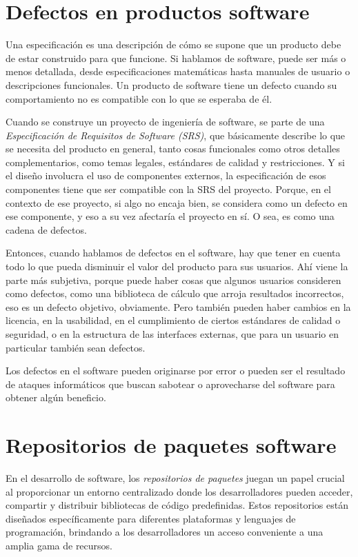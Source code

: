 \section{Defectos en productos software}

Una especificación es una descripción de cómo se supone que un producto debe de estar construido para
que funcione. Si hablamos de software, puede ser más o menos detallada, desde especificaciones
matemáticas hasta manuales de usuario o descripciones funcionales. Un producto de software tiene
un defecto cuando su comportamiento no es compatible con lo que se esperaba de él.

Cuando se construye un proyecto de ingeniería de software, se parte de una \textit{Especificación
    de Requisitos de Software (SRS)}, que básicamente describe lo que se necesita del producto en general,
tanto cosas funcionales como otros detalles complementarios, como temas legales, estándares de calidad y restricciones. Y si el diseño involucra el uso de componentes externos, la especificación de esos componentes tiene que ser compatible con la SRS del proyecto. Porque, en el contexto de ese proyecto, si algo no encaja bien, se considera como un defecto en ese componente, y eso a su vez afectaría el proyecto en sí. O sea, es como una cadena de defectos.

Entonces, cuando hablamos de defectos en el software, hay que tener en cuenta todo lo que pueda disminuir
el valor del producto para sus usuarios. Ahí viene la parte más subjetiva, porque puede haber cosas que
algunos usuarios consideren como defectos, como una biblioteca de cálculo que arroja resultados
incorrectos, eso es un defecto objetivo, obviamente. Pero también pueden haber cambios en la licencia,
en la usabilidad, en el cumplimiento de ciertos estándares de calidad o seguridad, o en la estructura
de las interfaces externas, que para un usuario en particular también sean defectos.

Los defectos en el software pueden originarse por error o pueden ser el resultado de ataques
informáticos que buscan sabotear o aprovecharse del software para obtener algún beneficio.

\section{Repositorios de paquetes software}

En el desarrollo de software, los \textit{repositorios de paquetes} juegan un papel crucial al
proporcionar un entorno centralizado donde los desarrolladores pueden acceder, compartir y distribuir
bibliotecas de código predefinidas. Estos repositorios están diseñados específicamente para diferentes
plataformas y lenguajes de programación, brindando a los desarrolladores un acceso conveniente a una
amplia gama de recursos.

